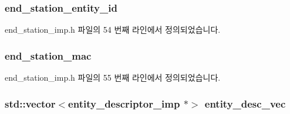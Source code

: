 \subsubsection[{\texorpdfstring{end\+\_\+station\+\_\+entity\+\_\+id}{end_station_entity_id}}]{ end\+\_\+station\+\_\+entity\+\_\+id\hspace{0.3cm}{\ttfamily [private]}}\hypertarget{classavdecc__lib_1_1end__station__imp_ac32ac278fb799e1b4f0cd539e0abe2b5}{}\label{classavdecc__lib_1_1end__station__imp_ac32ac278fb799e1b4f0cd539e0abe2b5}


end\+\_\+station\+\_\+imp.\+h 파일의 54 번째 라인에서 정의되었습니다.

\subsubsection[{\texorpdfstring{end\+\_\+station\+\_\+mac}{end_station_mac}}]{ end\+\_\+station\+\_\+mac\hspace{0.3cm}{\ttfamily [private]}}\hypertarget{classavdecc__lib_1_1end__station__imp_a0e9fa7b31d903107ff9e7aac9dac172d}{}\label{classavdecc__lib_1_1end__station__imp_a0e9fa7b31d903107ff9e7aac9dac172d}


end\+\_\+station\+\_\+imp.\+h 파일의 55 번째 라인에서 정의되었습니다.

\subsubsection[{\texorpdfstring{entity\+\_\+desc\+\_\+vec}{entity_desc_vec}}]{\setlength{\rightskip}{0pt plus 5cm}std\+::vector$<${\bf entity\+\_\+descriptor\+\_\+imp} $\ast$$>$ entity\+\_\+desc\+\_\+vec\hspace{0.3cm}{\ttfamily [private]}}\hypertarget{classavdecc__lib_1_1end__station__imp_a72edab41bc56e3c1757944a7df188a3d}{}\label{classavdecc__lib_1_1end__station__imp_a72edab41bc56e3c1757944a7df188a3d}


